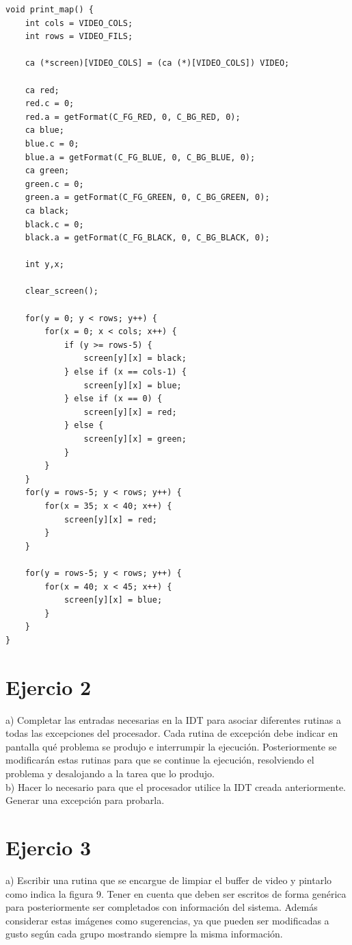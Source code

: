 \documentclass[a4paper]{article}
\begin{document}
\begin{codesnippet}
\begin{verbatim}
void print_map() {
    int cols = VIDEO_COLS;
    int rows = VIDEO_FILS;

    ca (*screen)[VIDEO_COLS] = (ca (*)[VIDEO_COLS]) VIDEO;

    ca red;
    red.c = 0;
    red.a = getFormat(C_FG_RED, 0, C_BG_RED, 0);
    ca blue;
    blue.c = 0;
    blue.a = getFormat(C_FG_BLUE, 0, C_BG_BLUE, 0);
    ca green;
    green.c = 0;
    green.a = getFormat(C_FG_GREEN, 0, C_BG_GREEN, 0);
    ca black;
    black.c = 0;
    black.a = getFormat(C_FG_BLACK, 0, C_BG_BLACK, 0);

    int y,x;

    clear_screen();
    
    for(y = 0; y < rows; y++) {
        for(x = 0; x < cols; x++) {
            if (y >= rows-5) {
                screen[y][x] = black;
            } else if (x == cols-1) {
                screen[y][x] = blue;
            } else if (x == 0) {
                screen[y][x] = red;
            } else {
                screen[y][x] = green;
            }
        }
    }
    for(y = rows-5; y < rows; y++) {
        for(x = 35; x < 40; x++) {
            screen[y][x] = red;
        }
    }

    for(y = rows-5; y < rows; y++) {
        for(x = 40; x < 45; x++) {
            screen[y][x] = blue;
        }
    }
}
\end{verbatim}
\end{codesnippet}

\newpage
\section{Ejercio 2}
{\large a)} Completar las entradas necesarias en la IDT para asociar diferentes rutinas a todas las
excepciones del procesador. Cada rutina de excepci\'on debe indicar en pantalla qu\'e problema
se produjo e interrumpir la ejecuci\'on. Posteriormente se modificar\'an estas rutinas
para que se continue la ejecuci\'on, resolviendo el problema y desalojando a la tarea que lo
produjo.\\

{\large b)} Hacer lo necesario para que el procesador utilice la IDT creada anteriormente. Generar
una excepci\'on para probarla.

\newpage
\section{Ejercio 3}
{\large a)} Escribir una rutina que se encargue de limpiar el buffer de video y pintarlo como indica
la figura 9. Tener en cuenta que deben ser escritos de forma gen\'erica para posteriormente
ser completados con informaci\'on del sistema. Adem\'as considerar estas im\'agenes como
sugerencias, ya que pueden ser modificadas a gusto seg\'un cada grupo mostrando siempre
la misma informaci\'on.\\
\end{document}
